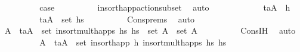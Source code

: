 \begin{isabellebody}
\ \ \ \ \ \ \isamarkupfalse%
\ \isamarkupfalse%
\ {\isacharquery}{\kern0pt}case\isanewline
\ \ \ \ \ \ \ \ \isamarkupfalse%
\ insort{\isacharunderscore}{\kern0pt}happ{\isacharunderscore}{\kern0pt}action{\isacharunderscore}{\kern0pt}subset\ \isamarkupfalse%
\ auto\isanewline
\ \ \ \ \isamarkupfalse%
\isanewline
\ \ \ \ \ \ \isamarkupfalse%
\ {\isachardoublequoteopen}{\isacharparenleft}{\kern0pt}t\isactrlsub a{\isacharcomma}{\kern0pt}A{\isacharparenright}{\kern0pt}\ {\isasymnoteq}\ h{\isachardoublequoteclose}\isanewline
\ \ \ \ \ \ \isamarkupfalse%
\ \isamarkupfalse%
\ {\isachardoublequoteopen}{\isacharparenleft}{\kern0pt}t\isactrlsub a{\isacharcomma}{\kern0pt}A{\isacharparenright}{\kern0pt}\ {\isasymin}\ set\ hs\isanewline
\ \ \ \ \ \ \ \ \isamarkupfalse%
\ Cons{\isachardot}{\kern0pt}prems\ \isamarkupfalse%
\ auto\isanewline
\ \ \ \ \ \ \isamarkupfalse%
\ \isamarkupfalse%
\ A{\isacharprime}{\kern0pt}\ \ {\isachardoublequoteopen}{\isacharparenleft}{\kern0pt}t\isactrlsub a{\isacharcomma}{\kern0pt}A{\isacharprime}{\kern0pt}{\isacharparenright}{\kern0pt}\ {\isasymin}\ set\ {\isacharparenleft}{\kern0pt}insort{\isacharunderscore}{\kern0pt}mult{\isacharunderscore}{\kern0pt}happs\ hs\ hs\ \ {\isachardoublequoteopen}set\ A\ {\isasymsubseteq}\ set\ A{\isacharprime}{\kern0pt}{\isachardoublequoteclose}\isanewline
\ \ \ \ \ \ \ \ \isamarkupfalse%
\ Cons{\isachardot}{\kern0pt}IH\ \isamarkupfalse%
\ auto\isanewline
\ \ \ \ \ \ \isamarkupfalse%
\ \isamarkupfalse%
\ A{\isacharprime}{\kern0pt}{\isacharprime}{\kern0pt}\ \ {\isachardoublequoteopen}{\isacharparenleft}{\kern0pt}t\isactrlsub a{\isacharcomma}{\kern0pt}A{\isacharprime}{\kern0pt}{\isacharprime}{\kern0pt}{\isacharparenright}{\kern0pt}\ {\isasymin}\ set\ {\isacharparenleft}{\kern0pt}insort{\isacharunderscore}{\kern0pt}happ\ h\ {\isacharparenleft}{\kern0pt}insort{\isacharunderscore}{\kern0pt}mult{\isacharunderscore}{\kern0pt}happs\ hs\ hs\ \isanewline

\end{isabellebody}
